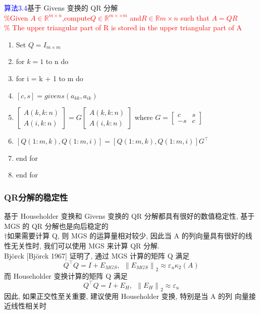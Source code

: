 \documentclass[12pt,a4paper]{article}
\begin{document}
\textcolor{blue}{算法3.4}基于 Givens 变换的 QR 分解\\
\textcolor{red}{\%Given $A \in \mathbb{R}^{m\times n}$,compute$Q \in \mathbb{R}^{m×\times m}$ and$R\in \mathbb{R}{m\times n}$ such that $A = QR$\\
	\% The upper triangular part of R is stored in the upper triangular part of A}
\begin{enumerate}[1:]
	\item Set $Q=I_{m\times m}$
	\item for $k=1$ to n do
	\item \qquad for i = k + 1 to m do
	\item \qquad \qquad $[c, s]=givens(a_{kk}, a_{ik})$
	\item \qquad \qquad $\left[\begin{array}{c}{A(k, k : n)} \\ {A(i, k : n)}\end{array}\right]=G\left[\begin{array}{c}{A(k, k : n)} \\ {A(i, k : n)}\end{array}\right]$ where $G=\left[\begin{array}{cc}{c} & {s} \\ {-s} & {c}\end{array}\right]$
	\item \qquad \qquad $[Q(1 : m, k), Q(1 : m, i)]=[Q(1 : m, k), Q(1 : m, i)] G^{\top}$
	\item \qquad end for
	\item end for
\end{enumerate}
\subsubsection{QR分解的稳定性}
\noindent 基于 Householder 变换和 Givens 变换的 QR 分解都具有很好的数值稳定性, 基于 MGS 的 QR 分解也是向后稳定的\\
$\dagger$如果需要计算 Q, 则 MGS 的运算量相对较少, 因此当 A 的列向量具有很好的线性无关性时, 我们可以使用 MGS 来计算 QR 分解.\\
Björck [Björck 1967] 证明了, 通过 MGS 计算的矩阵 Q 满足
$$
Q^{\top} Q=I+E_{M G S},~~\left\|E_{M G S}\right\|_{2} \approx \varepsilon_{u} \kappa_{2}(A)
$$
而 Householder 变换计算的矩阵 Q 满足
$$
Q^{\top} Q=I+E_{H},~~\left\|E_{H}\right\|_{2} \approx \varepsilon_{u}
$$
因此, 如果正交性至关重要, 建议使用 Householder 变换, 特别是当 A 的列 向量接近线性相关时
\end{document}
